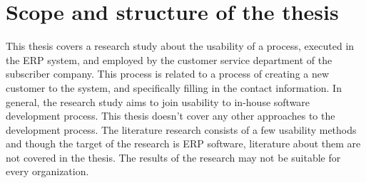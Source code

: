 \documentclass[12pt,a4paper,oneside,pdftex]{report}
\begin{document}
%    
%    
\section{Scope and structure of the thesis}
\label{sec:scope}

This thesis covers a research study about the usability of a process, executed in the ERP system, and employed by the customer service department of the subscriber company. This process is related to a process of creating a new customer to the system, and specifically filling in the contact information. In general, the research study aims to join usability to in-house software development process. This thesis doesn't cover any other approaches to the development process. The literature  research consists of a few usability methods and though the target of the research is ERP software, literature about them are not covered in the thesis. The results of the research may not be suitable for every organization.
\end{document}
